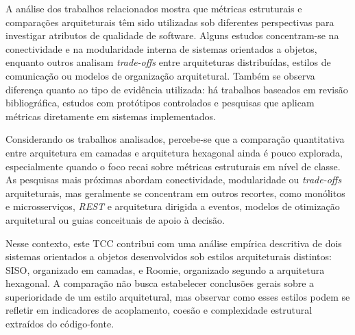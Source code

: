 A análise dos trabalhos relacionados mostra que métricas estruturais e comparações arquiteturais têm sido utilizadas 
sob diferentes perspectivas para investigar atributos de qualidade de software. Alguns estudos concentram-se na conectividade 
e na modularidade interna de sistemas orientados a objetos, enquanto outros analisam \textit{trade-offs} entre arquiteturas distribuídas, 
estilos de comunicação ou modelos de organização arquitetural. Também se observa diferença quanto ao tipo de evidência utilizada: 
há trabalhos baseados em revisão bibliográfica, estudos com protótipos controlados e pesquisas que aplicam métricas diretamente 
em sistemas implementados.

Considerando os trabalhos analisados, percebe-se que a comparação quantitativa entre arquitetura em camadas e arquitetura 
hexagonal ainda é pouco explorada, especialmente quando o foco recai sobre métricas estruturais em nível de classe. As 
pesquisas mais próximas abordam conectividade, modularidade ou \textit{trade-offs} arquiteturais, mas geralmente se concentram 
em outros recortes, como monólitos e microsserviços, \textit{REST} e arquitetura dirigida a eventos, modelos de otimização arquitetural 
ou guias conceituais de apoio à decisão.

Nesse contexto, este TCC contribui com uma análise empírica descritiva de dois sistemas orientados a objetos desenvolvidos 
sob estilos arquiteturais distintos: SISO, organizado em camadas, e Roomie, organizado segundo a arquitetura hexagonal. 
A comparação não busca estabelecer conclusões gerais sobre a superioridade de um estilo arquitetural, mas observar como 
esses estilos podem se refletir em indicadores de acoplamento, coesão e complexidade estrutural extraídos do código-fonte.